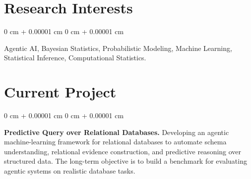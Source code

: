 \documentclass[10pt, letterpaper]{article}
\newenvironment{highlightsforbulletentries}{
    \begin{itemize}[
        topsep=0.10 cm,
        parsep=0.10 cm,
        partopsep=0pt,
        itemsep=0pt,
        leftmargin=10pt
    ]
}{
    \end{itemize}
} %
\newenvironment{onecolentry}{
    \begin{adjustwidth}{
        0 cm + 0.00001 cm
    }{
        0 cm + 0.00001 cm
    }
}{
    \end{adjustwidth}
} %
\begin{document}
    








    \section{Research Interests} 
        \begin{onecolentry}
        Agentic AI, Bayesian Statistics, Probabilistic Modeling, Machine Learning, Statistical Inference, Computational Statistics.
        \end{onecolentry}

        \vspace{0.2 cm}
    \section{Current Project}

        \begin{onecolentry}
            \textbf{Predictive Query over Relational Databases.} Developing an agentic machine-learning framework for relational databases to automate schema understanding, relational evidence construction, and predictive reasoning over structured data. The long-term objective is to build a benchmark for evaluating agentic systems on realistic database tasks.
        \end{onecolentry}
\end{document}
